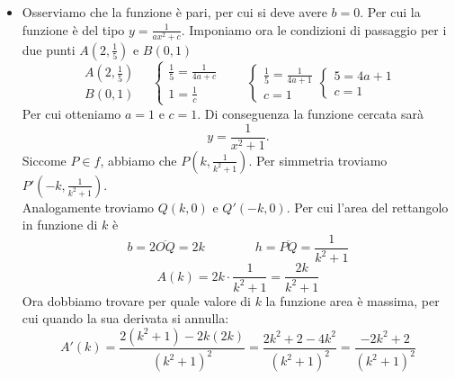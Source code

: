 \begin{ex}
\begin{center}
        \end{center}
\begin{itemize}
    \item Osserviamo che la funzione è pari, per cui si deve avere $b=0$. Per cui la funzione è del tipo $y=\frac{1}{ax^2+c}$. Imponiamo ora le condizioni di passaggio per i due punti $A\left(2,\frac{1}{5}\right)$ e $B(0,1)$
    \[\begin{array}{r}
        A\left(2,\frac{1}{5}\right)\\
        B(0,1)
    \end{array} \quad\begin{cases}
        \frac{1}{5}=\frac{1}{4a+c}\\
        1=\frac{1}{c}
    \end{cases}\qquad
    \begin{cases}
        \frac{1}{5}=\frac{1}{4a+1}\\
        c=1
    \end{cases}
    \begin{cases}
        {5}={4a+1}\\
        c=1
    \end{cases}
    \]
    Per cui otteniamo $a=1$ e $c=1$. Di conseguenza la funzione cercata sarà
    \[y=\frac{1}{x^2+1}.\]
    Siccome $P\in f$, abbiamo che $P\left(k, \frac{1}{k^2+1}\right)$. Per simmetria troviamo $P'\left(-k, \frac{1}{k^2+1}\right)$. \\Analogamente troviamo $Q(k,0)$ e $ Q'(-k,0)$. Per cui l'area del rettangolo in funzione di $k$ è 
    \[b=2\overline{OQ}=2k\qquad \qquad h=\overline{PQ}=\frac{1}{k^2+1}\]
    \[A(k)=2k\cdot \frac{1}{k^2+1}=\frac{2k}{k^2+1}\]
    Ora dobbiamo trovare per quale valore di $k$ la funzione area è massima, per cui quando la sua derivata si annulla:
    \[A'(k)=\frac{2(k^2+1)-2k(2k)}{(k^2+1)^2}=\frac{2k^2+2-4k^2}{(k^2+1)^2}=\frac{-2k^2+2}{(k^2+1)^2}\]

\end{itemize}
\end{ex}
